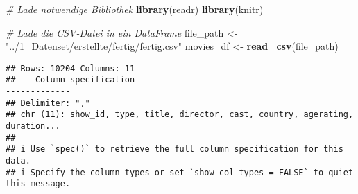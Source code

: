 \documentclass[
]{article}
\newenvironment{Shaded}{\begin{snugshade}}{\end{snugshade}}
\newcommand{\CommentTok}[1]{\textcolor[rgb]{0.56,0.35,0.01}{\textit{#1}}}
\newcommand{\FunctionTok}[1]{\textcolor[rgb]{0.13,0.29,0.53}{\textbf{#1}}}
\newcommand{\NormalTok}[1]{#1}
\newcommand{\OtherTok}[1]{\textcolor[rgb]{0.56,0.35,0.01}{#1}}
\newcommand{\StringTok}[1]{\textcolor[rgb]{0.31,0.60,0.02}{#1}}
\begin{document}
\begin{Shaded}
\begin{Highlighting}[]
\CommentTok{\# Lade notwendige Bibliothek}
\FunctionTok{library}\NormalTok{(readr)}
\FunctionTok{library}\NormalTok{(knitr)}

\CommentTok{\# Lade die CSV{-}Datei in ein DataFrame}
\NormalTok{file\_path }\OtherTok{\textless{}{-}} \StringTok{"../1\_Datenset/erstellte/fertig/fertig.csv"}
\NormalTok{movies\_df }\OtherTok{\textless{}{-}} \FunctionTok{read\_csv}\NormalTok{(file\_path)}
\end{Highlighting}
\end{Shaded}

\begin{verbatim}
## Rows: 10204 Columns: 11
## -- Column specification --------------------------------------------------------
## Delimiter: ","
## chr (11): show_id, type, title, director, cast, country, agerating, duration...
## 
## i Use `spec()` to retrieve the full column specification for this data.
## i Specify the column types or set `show_col_types = FALSE` to quiet this message.
\end{verbatim}
\end{document}
